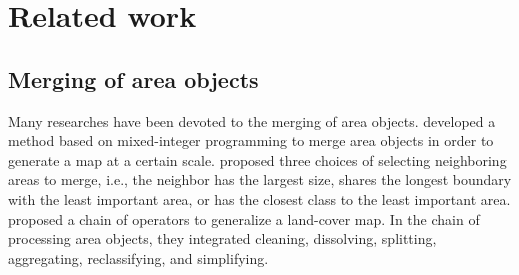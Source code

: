\documentclass{ica}
\begin{document}










\section{Related work}
\label{sec:realted_work}





\subsection{Merging of area objects}
Many researches have been devoted to the merging of area objects.
\citet{HaunertWolff2010AreaAgg} developed a method based on
mixed-integer programming to merge area objects
in order to generate a map at a certain scale.
\citet{Cheng2006} proposed three choices of 
selecting neighboring areas to merge, i.e.,
the neighbor has the largest size, 
shares the longest boundary with the least important area,
or has the closest class to the least important area.
\citet{Thiemann2018LandCover} proposed a chain of operators 
to generalize a land-cover map.
In the chain of processing area objects, 
they integrated cleaning, dissolving, splitting, 
aggregating, reclassifying, and simplifying. 
\end{document}
